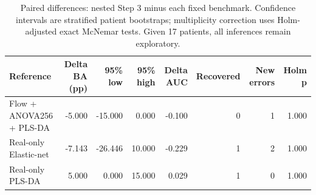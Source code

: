 \begin{table}[t]
\centering
\caption{Paired differences: nested Step 3 minus each fixed benchmark. Confidence intervals are stratified patient bootstraps; multiplicity correction uses Holm-adjusted exact McNemar tests. Given 17 patients, all inferences remain exploratory.}
\label{tab:fixed_benchmark_delta}
\footnotesize
\setlength{\tabcolsep}{4pt}
\begin{tabular}{lrrrrrrr}
\toprule
Reference & Delta BA (pp) & 95\% low & 95\% high & Delta AUC & Recovered & New errors & Holm p \\
\midrule
Flow + ANOVA256 + PLS-DA & -5.000 & -15.000 & 0.000 & -0.100 & 0 & 1 & 1.000 \\
Real-only Elastic-net & -7.143 & -26.446 & 10.000 & -0.229 & 1 & 2 & 1.000 \\
Real-only PLS-DA & 5.000 & 0.000 & 15.000 & 0.029 & 1 & 0 & 1.000 \\
\bottomrule
\end{tabular}
\end{table}
